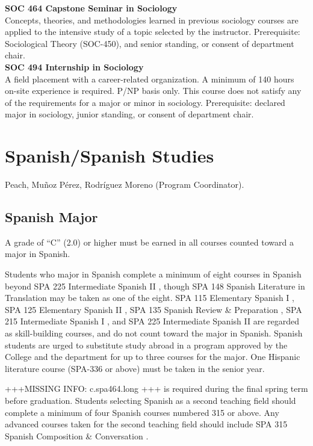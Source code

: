 \documentclass[
  letterpaper,
]{scrbook}
\begin{document}
\textbf{SOC 464 Capstone Seminar in Sociology}\\
Concepts, theories, and methodologies learned in previous sociology
courses are applied to the intensive study of a topic selected by the
instructor. Prerequisite: Sociological Theory (SOC-450), and senior
standing, or consent of department chair.\\
\textbf{SOC 494 Internship in Sociology}\\
A field placement with a career-related organization. A minimum of 140
hours on-site experience is required. P/NP basis only. This course does
not satisfy any of the requirements for a major or minor in sociology.
Prerequisite: declared major in sociology, junior standing, or consent
of department chair.

\section{Spanish/Spanish Studies}\label{spanishspanish-studies}

Peach, Muñoz Pérez, Rodríguez Moreno (Program Coordinator).

\subsection{Spanish Major}\label{spanish-major}

A grade of ``C'' (2.0) or higher must be earned in all courses counted
toward a major in Spanish.

Students who major in Spanish complete a minimum of eight courses in
Spanish beyond SPA 225 Intermediate Spanish II , though SPA 148 Spanish
Literature in Translation may be taken as one of the eight. SPA 115
Elementary Spanish I , SPA 125 Elementary Spanish II , SPA 135 Spanish
Review \& Preparation , SPA 215 Intermediate Spanish I , and SPA 225
Intermediate Spanish II are regarded as skill-building courses, and do
not count toward the major in Spanish. Spanish students are urged to
substitute study abroad in a program approved by the College and the
department for up to three courses for the major. One Hispanic
literature course (SPA-336 or above) must be taken in the senior year.

+++MISSING INFO: c.spa464.long +++ is required during the final spring
term before graduation. Students selecting Spanish as a second teaching
field should complete a minimum of four Spanish courses numbered 315 or
above. Any advanced courses taken for the second teaching field should
include SPA 315 Spanish Composition \& Conversation .
\end{document}
